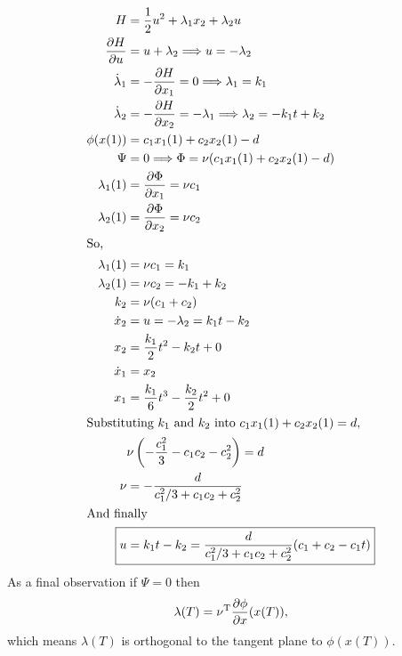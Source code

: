 \begin{align}
  H &= \frac12 u^2 + \lambda_1 x_2 + \lambda_2 u \\
  \pder{H}{u} &= u + \lambda_2 \Longrightarrow u = -\lambda_2 \\
  \dot\lambda_1 &= -\pder{H}{x_1} = 0 \Longrightarrow \lambda_1 = k_1 \\
  \dot\lambda_2 &= -\pder{H}{x_2} = -\lambda_1 \Longrightarrow \lambda_2 = -k_1 t + k_2 \\
  \phi(x(1)) &= c_1 x_1(1) + c_2 x_2(1) - d \\
  \Psi &= 0 \Longrightarrow \Phi = \nu (c_1x_1(1) + c_2x_2(1) - d) \\
  \lambda_1(1) &= \pder{\Phi}{x_1} = \nu c_1 \\
  \lambda_2(1) &= \pder{\Phi}{x_2} = \nu c_2 \\
  \shortintertext{So,}
  \lambda_1(1) &= \nu c_1 = k_1 \\
  \lambda_2(1) &= \nu c_2 = -k_1 + k_2 \\
  k_2 &= \nu (c_1 + c_2) \\
  \dot x_2 &= u = -\lambda_2 = k_1 t - k_2 \\
  x_2 &= \frac{k_1}{2} t^2 - k_2 t + 0 \\
  \dot x_1 &= x_2 \\
  x_1 &= \frac{k_1}{6} t^3 - \frac{k_2}{2} t^2 + 0 \\
  \shortintertext{Substituting $k_1$ and $k_2$ into $c_1x_1(1)+c_2x_2(1)=d$,}
    & \nu \left( -\frac{c_1^2}{3} - c_1 c_2 - c_2^2 \right) = d \\
  \nu &= - \frac{d}{c_1^2/3 + c_1c_2 + c_2^2} \\
  \shortintertext{And finally}
  \Aboxed{u &= k_1 t - k_2 = \frac{d}{c_1^2/3 + c_1c_2 + c_2^2} (c_1 + c_2 - c_1 t)}
\end{align}
As a final observation if $\Psi=0$ then
\[
  \lambda(T) = \nu^\text{T} \frac{\partial \phi}{\partial x}(x(T)),
\]
which means $\lambda(T)$ is orthogonal to the tangent plane to $\phi(x(T))$.

\begin{center}
\end{center}

